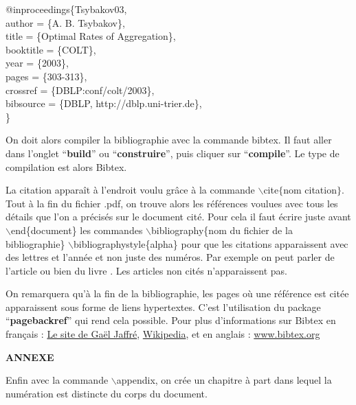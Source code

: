 \documentclass[11pt]{article}
\theoremstyle{remark}
\theoremstyle{definition}
\begin{document}
\noindent @inproceedings\{Tsybakov03, \\
  author    = \{A. B. Tsybakov\}, \\
  title     = \{Optimal Rates of Aggregation\}, \\
  booktitle = \{COLT\}, \\
  year      = \{2003\}, \\
  pages     = \{303-313\}, \\
  crossref  = \{DBLP:conf/colt/2003\}, \\
  bibsource = \{DBLP, http://dblp.uni-trier.de\}, \\
\}

On doit alors compiler la bibliographie avec la commande bibtex. Il faut aller dans l'onglet ``\textbf{build}'' ou ``\textbf{construire}'', puis cliquer sur ``\textbf{compile}''. Le type de compilation est alors Bibtex.\medskip

La citation apparaît à l'endroit voulu grâce à la commande  $\backslash$cite$\{$nom citation$\}$. Tout à la fin du fichier .pdf, on trouve alors  les références voulues avec tous les détails que l'on a précisés sur le document cité. Pour cela il faut  écrire juste avant $\backslash$end\{document\} les commandes $\backslash$bibliography\{nom du fichier de la bibliographie\}
$\backslash$bibliographystyle\{alpha\} pour que les citations apparaissent avec des lettres et l'année et non juste des numéros. Par exemple on peut parler de l'article \cite{Tsybakov03} ou bien du livre \cite{Catoni04}. Les articles non cités n'apparaissent pas. \medskip

On remarquera qu'à la fin de la bibliographie, les pages où une référence est citée apparaissent sous forme de liens hypertextes. C'est l'utilisation du package ``\textbf{pagebackref}'' qui rend cela possible.
Pour plus d'informations sur Bibtex en français : \href{http://www.irit.fr/~Gael.Jaffre/LOGICIELS/LATEX_BIBTEX/bibtex1.html}{Le site de Gaël Jaffré}, \href{http://fr.wikipedia.org/wiki/BibTeX}{Wikipedia},  et en anglais :  \href{http://www.bibtex.org/}{www.bibtex.org}



\newpage
\appendix
\begin{center}
    {\bf ANNEXE}
  \end{center}
Enfin avec la commande $\backslash$appendix, on crée un chapitre à part dans lequel la numération est distincte du corps du document.
\end{document}
